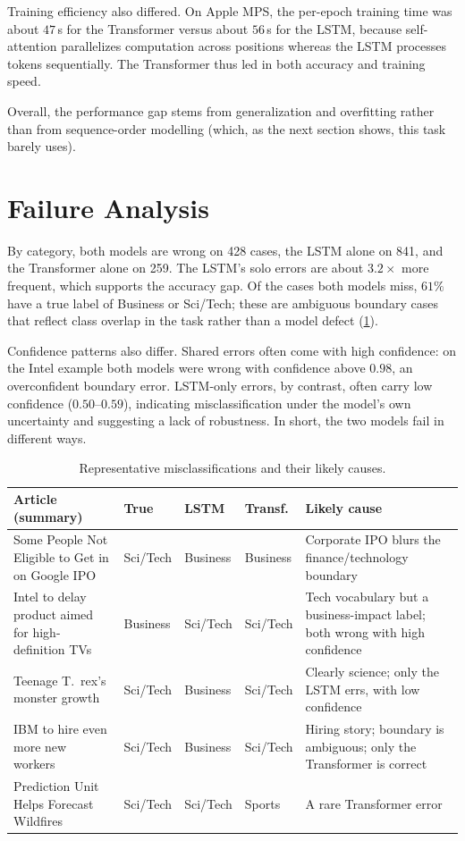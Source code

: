 \documentclass[10pt,twocolumn,letterpaper]{article}
\begin{document}
Training efficiency also differed. On Apple MPS, the per-epoch training time
was about $47$\,s for the Transformer versus about $56$\,s for the LSTM, because
self-attention parallelizes computation across positions whereas the LSTM
processes tokens sequentially. The Transformer thus led in both accuracy and
training speed.

Overall, the performance gap stems from generalization and overfitting rather
than from sequence-order modelling (which, as the next section shows, this task
barely uses).

\section{Failure Analysis}
By category, both models are wrong on 428 cases, the LSTM alone on 841, and the
Transformer alone on 259. The LSTM's solo errors are about $3.2\times$ more
frequent, which supports the accuracy gap. Of the cases both models miss,
$61\%$ have a true label of Business or Sci/Tech; these are ambiguous boundary
cases that reflect class overlap in the task rather than a model defect
(\cref{tab:fail}).

Confidence patterns also differ. Shared errors often come with high confidence:
on the Intel example both models were wrong with confidence above $0.98$, an
overconfident boundary error. LSTM-only errors, by contrast, often carry low
confidence ($0.50$--$0.59$), indicating misclassification under the model's own
uncertainty and suggesting a lack of robustness. In short, the two models fail
in different ways.

\begin{table}[t]
\centering\footnotesize
\begin{tabularx}{\textwidth}{XlllX}
\toprule
Article (summary) & True & LSTM & Transf. & Likely cause \\
\midrule
Some People Not Eligible to Get in on Google IPO & Sci/Tech & Business & Business & Corporate IPO blurs the finance/technology boundary \\
Intel to delay product aimed for high-definition TVs & Business & Sci/Tech & Sci/Tech & Tech vocabulary but a business-impact label; both wrong with high confidence \\
Teenage T.\ rex's monster growth & Sci/Tech & Business & Sci/Tech & Clearly science; only the LSTM errs, with low confidence \\
IBM to hire even more new workers & Sci/Tech & Business & Sci/Tech & Hiring story; boundary is ambiguous; only the Transformer is correct \\
Prediction Unit Helps Forecast Wildfires & Sci/Tech & Sci/Tech & Sports & A rare Transformer error \\
\bottomrule
\end{tabularx}
\caption{Representative misclassifications and their likely causes.}
\label{tab:fail}
\end{table}
\end{document}
